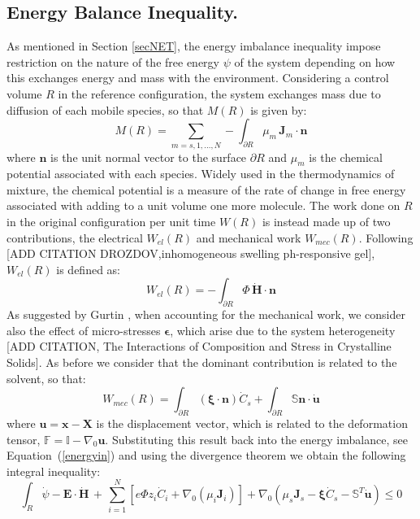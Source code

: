 \documentclass[runningheads]{llncs}
\newcommand{\F}{\ensuremath{\mathbb{F}}}
\begin{document}
\subsection{Energy Balance Inequality.}
As mentioned in Section \ref{secNET}, the energy imbalance inequality impose restriction on the nature of the free energy $\psi$ of the system depending on how this exchanges energy and mass with the environment. Considering a control volume $R$ in the reference configuration, the system exchanges mass due to diffusion of each mobile species, so that $M(R)$ is given by:
\begin{equation}
M(R)= \sum\limits_{m=s,1,\ldots,N} - \int_{\partial R} \mu_m \,\mathbf{J}_m \cdot \mathbf{n} 
\end{equation}
where $\mathbf{n}$ is the unit normal vector to the surface $\partial R$ and $\mu_m$ is the chemical potential associated with each species. Widely used in the thermodynamics of mixture, the chemical potential is a measure of the rate of change in free energy associated with adding to a unit volume one more molecule. The work done on $R$ in the original configuration per unit time $W(R)$ is instead made up of two contributions, the electrical $W_{el}(R)$ and mechanical work $W_{mec}(R)$. Following [ADD CITATION DROZDOV,inhomogeneous swelling ph-responsive gel], $W_{el}(R)$ is defined as:
\begin{equation}
W_{el}(R) = -\int_{\partial R} \Phi\, \dot{\mathbf{H}}\cdot \mathbf{n}
\end{equation}
As suggested by Gurtin \cite{GURTIN}, when accounting for the mechanical work, we consider also the effect of micro-stresses $\boldsymbol{\epsilon}$, which arise due to the system heterogeneity [ADD CITATION, The Interactions of Composition and Stress 
in Crystalline Solids]. As before we consider that the dominant contribution is related to the solvent, so that:
\begin{equation}
W_{mec}(R) = \int_{\partial R} \left(\boldsymbol{\xi}\cdot \mathbf{n}\right)\dot{C}_s + \int_{\partial R} \mathbb{S}\mathbf{n} \cdot \dot{\mathbf{u}}
\end{equation}
where $\mathbf{u}= \mathbf{x}-\mathbf{X}$ is the displacement vector, which is related to the deformation tensor, $\F=\mathbb{I}-\nabla_0 \mathbf{u}$. Substituting this result back into the energy imbalance, see Equation~(\ref{energyin}) and using the divergence theorem we obtain the following integral inequality:
\begin{equation}
\int_R \dot{\psi} - \mathbf{E}\cdot \dot{\mathbf{H}} \, + \, \sum\limits_{i=1}^{N} \left[e \Phi  z_i \dot{C}_i+ \nabla_0 \left(\mu_i \mathbf{J}_i \right)\right] + \nabla_0 (\mu_s \mathbf{J}_s- \boldsymbol{\xi}\dot{C}_s -\mathbb{S}^T\mathbf{\dot{u}}) \leq 0 
\end{equation}
\end{document}
